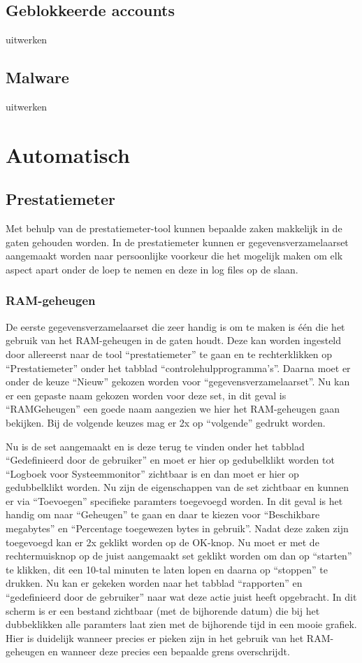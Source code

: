 \documentclass[pdftex,a4paper,12pt]{report}
\begin{document}
\subsection{Geblokkeerde accounts}
uitwerken

\subsection{Malware}
uitwerken

\section{Automatisch}
\subsection{Prestatiemeter}
Met behulp van de prestatiemeter-tool kunnen bepaalde zaken makkelijk in de gaten gehouden worden. In de prestatiemeter kunnen er gegevensverzamelaarset aangemaakt worden naar persoonlijke voorkeur die het mogelijk maken om elk aspect apart onder de loep te nemen en deze in log files op de slaan.

\subsubsection{RAM-geheugen}
De eerste gegevensverzamelaarset die zeer handig is om te maken is één die het gebruik van het RAM-geheugen in de gaten houdt. Deze kan worden ingesteld door allereerst naar de tool "`prestatiemeter"' te gaan en te rechterklikken op "`Prestatiemeter"' onder het tabblad "`controlehulpprogramma's"'. Daarna moet er onder de keuze "`Nieuw"' gekozen worden voor "`gegevensverzamelaarset"'. Nu kan er een gepaste naam gekozen worden voor deze set, in dit geval is "`RAMGeheugen"' een goede naam aangezien we hier het RAM-geheugen gaan bekijken. Bij de volgende keuzes mag er 2x op "`volgende"' gedrukt worden. \newline

Nu is de set aangemaakt en is deze terug te vinden onder het tabblad "`Gedefinieerd door de gebruiker"' en moet er hier op gedubelklikt worden tot "`Logboek voor Systeemmonitor"' zichtbaar is en dan moet er hier op gedubbelklikt worden. Nu zijn de eigenschappen van de set zichtbaar en kunnen er via "`Toevoegen"' specifieke paramters toegevoegd worden. In dit geval is het handig om naar "`Geheugen"' te gaan en daar te kiezen voor "`Beschikbare megabytes"' en "`Percentage toegewezen bytes in gebruik"'.	Nadat deze zaken zijn toegevoegd kan er 2x geklikt worden op de OK-knop. Nu moet er met de rechtermuisknop op de juist aangemaakt set geklikt worden om dan op "`starten"' te klikken, dit een 10-tal minuten te laten lopen en daarna op "`stoppen"' te drukken. Nu kan er gekeken worden naar het tabblad "`rapporten"' en "`gedefinieerd door de gebruiker"' naar wat deze actie juist heeft opgebracht. In dit scherm is er een bestand zichtbaar (met de bijhorende datum) die bij het dubbeklikken alle paramters laat zien met de bijhorende tijd in een mooie grafiek. Hier is duidelijk wanneer precies er pieken zijn in het gebruik van het RAM-geheugen en wanneer deze precies een bepaalde grens overschrijdt.
\end{document}
